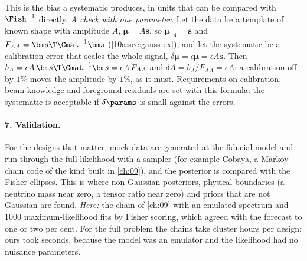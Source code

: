 This is the bias a systematic produces, in units that can be compared with $\Fish^{-1}$ directly. \emph{A check
with one parameter.} Let the data be a template of known shape with amplitude $A$, $\bm\mu=A\bm s$, so $\bm\mu_{,A}=\bm s$
and $F_{AA}=\bm s\T\Cmat^{-1}\bm s$ (\cref{10a:sec:gauss-ex}), and let the systematic be a calibration error that scales the
whole signal, $\delta\bm\mu=\epsilon\bm\mu=\epsilon A\bm s$. Then $b_A=\epsilon A\,\bm s\T\Cmat^{-1}\bm s=\epsilon A\,F_{AA}$ and $\delta A=b_A/F_{AA}=\epsilon A$: a calibration
off by $1\%$ moves the amplitude by $1\%$, as it must. Requirements on calibration, beam knowledge and foreground
residuals are set with this formula: the systematic is acceptable if $\delta\params$ is small against the errors.

\paragraph{7. Validation.} For the designs that matter, mock data are generated at the fiducial model and run
through the full likelihood with a sampler (for example Cobaya, a Markov chain code of the kind built in
\cref{ch:09}), and the posterior is compared with
the Fisher ellipses. This is where non-Gaussian posteriors, physical boundaries (a neutrino mass near zero, a
tensor ratio near zero) and priors that are not Gaussian are found. \emph{Here:} the chain of \cref{ch:09} with an emulated
spectrum and $1000$ maximum-likelihood fits by Fisher scoring, which agreed with the forecast to one or two per cent.
For the full problem the chains take cluster hours per design; ours took seconds, because the model was an emulator
and the likelihood had no nuisance parameters.

